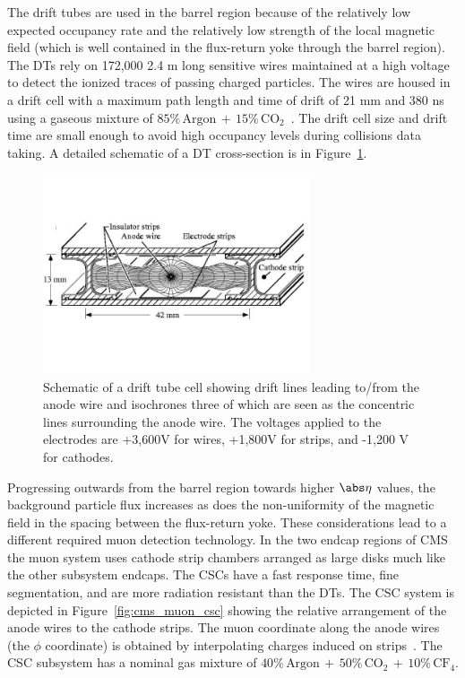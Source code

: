 The drift tubes are used in the barrel region
because of the relatively low expected occupancy rate and the relatively low strength of the local
magnetic field (which is well contained in the flux-return yoke through the barrel region).
The DTs rely on 172,000 2.4 m long sensitive wires maintained at a high voltage to detect the ionized traces
of passing charged particles. The wires are housed in a drift cell with a maximum path length
and time of drift of 21 mm and 380 ns using a gaseous mixture of 
$85\% \, \textrm{Argon} \, + \, 15\% \, \textrm{CO}_{2}$~\cite{CMS-Proposal}. The drift cell size and drift
time are small enough to avoid high occupancy levels during collisions data taking.
A detailed schematic of a DT cross-section is in Figure~\ref{fig:cms_muon_dt}.

\begin{figure}[htbp]
\centering
     \includegraphics[width=0.7\textwidth]{cms_and_lhc/plots/cms_muon_dt.jpg}
     \caption{
Schematic of a drift tube cell showing drift lines leading to/from the anode wire 
and isochrones three of which are seen as the concentric lines surrounding the 
anode wire. The voltages applied to the 
electrodes are +3,600V for wires, +1,800V for strips, and -1,200 V for cathodes.
     }
     \label{fig:cms_muon_dt}
\end{figure}

Progressing outwards from the barrel region towards higher $\abs\eta$ values, the background 
particle flux increases as does the non-uniformity of the magnetic field in the spacing between
the flux-return yoke. These considerations lead to a different required muon detection technology.
In the two endcap regions of CMS the muon system uses cathode strip chambers arranged as large
disks much like the other subsystem endcaps. The CSCs have a fast 
response time, fine segmentation, and are more radiation resistant than the DTs. The CSC system
is depicted in Figure~\ref{fig:cms_muon_csc} showing the relative arrangement of the anode
wires to the cathode strips. The muon coordinate along the anode wires (the $\phi$ coordinate) 
is obtained by interpolating charges induced on strips~\cite{cms_csc_gas}.
The CSC subsystem has a nominal gas mixture of 
$40\% \, \textrm{Argon} \, + \, 50\% \, \textrm{CO}_{2} \, + \, 10\% \, \textrm{CF}_{4}$.


